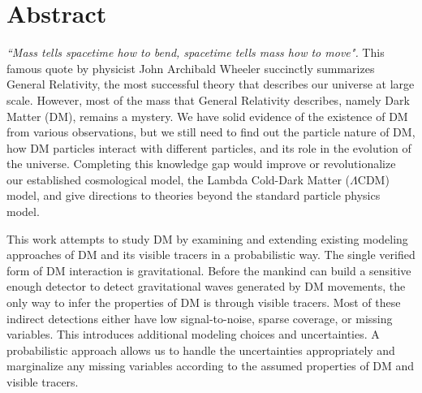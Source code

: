 \documentclass[ucdthesis.tex]{subfiles}
\begin{document}

    \doublespacing
		\section*{Abstract} 

		{\it ``Mass tells spacetime how to bend, spacetime tells mass how to move".}
		This famous quote by physicist John Archibald Wheeler succinctly summarizes General
		Relativity,  the most successful theory that describes our universe
		at large scale. However, most of the mass that General Relativity describes,
		namely Dark Matter (DM), remains a mystery.  
		We have solid evidence of the existence of DM from various
		observations, but we still need to find out the particle nature of DM,  
		how DM particles interact with different particles, and its role in the
		evolution of the universe. Completing this knowledge gap would improve or 
		revolutionalize our established cosmological model,
		the Lambda Cold-Dark Matter	($\Lambda$CDM) model, 
		and give directions to theories beyond the standard particle
		physics model. 

			This work attempts to study DM by examining and
		extending existing modeling approaches of DM and its visible tracers in a
		probabilistic way. The single verified form of 
		DM interaction is gravitational. Before the mankind can build a sensitive 
		enough detector to detect gravitational waves generated by DM movements, the 
		only way to infer the properties of DM is through visible tracers. Most of 
		these indirect detections	either have low signal-to-noise, sparse coverage, 
		or missing
		variables. This introduces additional
		modeling choices and uncertainties. A probabilistic approach allows us to
		handle the uncertainties appropriately and marginalize any 
		missing variables 
		according to the assumed properties of DM and visible tracers. 	
		
\end{document}

